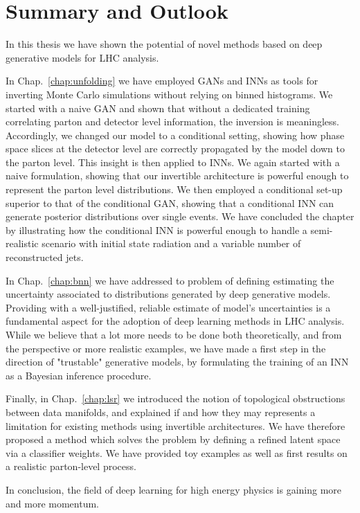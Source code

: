 %
%
%

\chapter{Summary and Outlook}\label{chap:summ}
\enlargethispage{2ex}
\vspace*{-2pt}

In this thesis we have shown the potential of novel methods based on deep generative models for LHC analysis. 

\medskip
In Chap.~\ref{chap:unfolding} we have employed GANs and INNs as tools for inverting Monte Carlo simulations without relying on binned histograms. We started with a naive GAN and shown that without a dedicated training correlating parton and detector level information, the inversion is meaningless. Accordingly, we changed our model to a conditional setting, showing how phase space slices at the detector level are correctly propagated by the model down to the parton level. This insight is then applied to INNs. We again started with a naive formulation, showing that our invertible architecture is powerful enough to represent the parton level distributions. We then employed a conditional set-up superior to that of the conditional GAN, showing that a conditional INN can generate posterior distributions over single events. We have concluded the chapter by illustrating how the conditional INN is powerful enough to handle a semi-realistic scenario with initial state radiation and a variable number of reconstructed jets.

\medskip

In Chap.~\ref{chap:bnn} we have addressed to problem of defining estimating the uncertainty associated to distributions generated by deep generative models. Providing with a well-justified, reliable estimate of model's uncertainties is a fundamental aspect for the adoption of deep learning methods in LHC analysis. While we believe that a lot more needs to be done both theoretically, and from the perspective or more realistic examples, we have made a first step in the direction of "trustable" generative models, by formulating the training of an INN as a Bayesian inference procedure.

\medskip

Finally, in Chap.~\ref{chap:lsr} we introduced the notion of topological obstructions between data manifolds, and explained if and how they may represents a limitation for existing methods using invertible architectures. We have therefore proposed a method which solves the problem by defining a refined latent space via a classifier weights. We have provided toy examples as well as first results on a realistic parton-level process.

\medskip

In conclusion, the field of deep learning for high energy physics is gaining more and more momentum.
